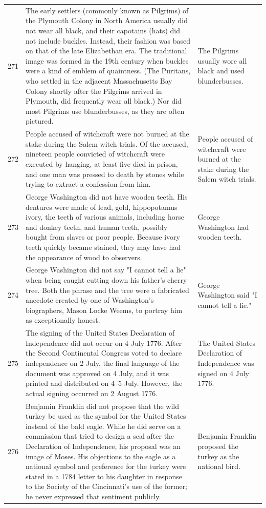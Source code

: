 \begin{tabular}{c|p{}|p{}}
271 & The early settlers (commonly known as Pilgrims) of the Plymouth Colony in North America usually did not wear all black, and their capotains (hats) did not include buckles. Instead, their fashion was based on that of the late Elizabethan era. The traditional image was formed in the 19th century when buckles were a kind of emblem of quaintness. (The Puritans, who settled in the adjacent Massachusetts Bay Colony shortly after the Pilgrims arrived in Plymouth, did frequently wear all black.) Nor did most Pilgrims use blunderbusses, as they are often pictured. & The Pilgrims usually wore all black and used blunderbusses. \\
272 & People accused of witchcraft were not burned at the stake during the Salem witch trials. Of the accused, nineteen people convicted of witchcraft were executed by hanging, at least five died in prison, and one man was pressed to death by stones while trying to extract a confession from him. & People accused of witchcraft were burned at the stake during the Salem witch trials. \\
273 & George Washington did not have wooden teeth. His dentures were made of lead, gold, hippopotamus ivory, the teeth of various animals, including horse and donkey teeth, and human teeth, possibly bought from slaves or poor people. Because ivory teeth quickly became stained, they may have had the appearance of wood to observers. & George Washington had wooden teeth. \\
274 & George Washington did not say "I cannot tell a lie" when being caught cutting down his father's cherry tree. Both the phrase and the tree were a fabricated anecdote created by one of Washington's biographers, Mason Locke Weems, to portray him as exceptionally honest. & George Washington said "I cannot tell a lie." \\
275 & The signing of the United States Declaration of Independence did not occur on 4 July 1776. After the Second Continental Congress voted to declare independence on 2 July, the final language of the document was approved on 4 July, and it was printed and distributed on 4–5 July. However, the actual signing occurred on 2 August 1776. & The United States Declaration of Independence was signed on 4 July 1776. \\
276 & Benjamin Franklin did not propose that the wild turkey be used as the symbol for the United States instead of the bald eagle. While he did serve on a commission that tried to design a seal after the Declaration of Independence, his proposal was an image of Moses. His objections to the eagle as a national symbol and preference for the turkey were stated in a 1784 letter to his daughter in response to the Society of the Cincinnati's use of the former; he never expressed that sentiment publicly. & Benjamin Franklin proposed the turkey as the national bird. \\

\end{tabular}
